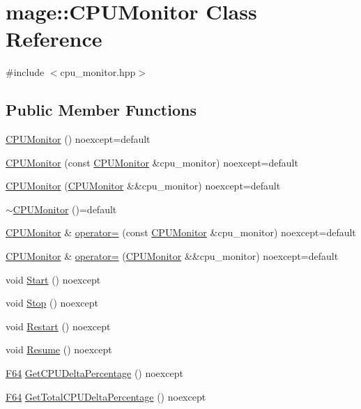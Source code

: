 \hypertarget{classmage_1_1_c_p_u_monitor}{}\section{mage\+:\+:C\+P\+U\+Monitor Class Reference}
\label{classmage_1_1_c_p_u_monitor}


{\ttfamily \#include $<$cpu\+\_\+monitor.\+hpp$>$}

\subsection*{Public Member Functions}
\begin{DoxyCompactItemize}
\item 
\mbox{\hyperlink{classmage_1_1_c_p_u_monitor_ad41542b831ae42cf8dbb206a70535598}{C\+P\+U\+Monitor}} () noexcept=default
\item 
\mbox{\hyperlink{classmage_1_1_c_p_u_monitor_a8d53a4b373c63d074fcb0cb969b3f7cb}{C\+P\+U\+Monitor}} (const \mbox{\hyperlink{classmage_1_1_c_p_u_monitor}{C\+P\+U\+Monitor}} \&cpu\+\_\+monitor) noexcept=default
\item 
\mbox{\hyperlink{classmage_1_1_c_p_u_monitor_a415f77c86323428f233f955249f5b252}{C\+P\+U\+Monitor}} (\mbox{\hyperlink{classmage_1_1_c_p_u_monitor}{C\+P\+U\+Monitor}} \&\&cpu\+\_\+monitor) noexcept=default
\item 
\mbox{\hyperlink{classmage_1_1_c_p_u_monitor_a597ea4b27675a22d3d66a1d817b26652}{$\sim$\+C\+P\+U\+Monitor}} ()=default
\item 
\mbox{\hyperlink{classmage_1_1_c_p_u_monitor}{C\+P\+U\+Monitor}} \& \mbox{\hyperlink{classmage_1_1_c_p_u_monitor_a878cc9fd170e6c34ee28f06591b06eeb}{operator=}} (const \mbox{\hyperlink{classmage_1_1_c_p_u_monitor}{C\+P\+U\+Monitor}} \&cpu\+\_\+monitor) noexcept=default
\item 
\mbox{\hyperlink{classmage_1_1_c_p_u_monitor}{C\+P\+U\+Monitor}} \& \mbox{\hyperlink{classmage_1_1_c_p_u_monitor_af1eacba414b2db72cf13d335f78785cd}{operator=}} (\mbox{\hyperlink{classmage_1_1_c_p_u_monitor}{C\+P\+U\+Monitor}} \&\&cpu\+\_\+monitor) noexcept=default
\item 
void \mbox{\hyperlink{classmage_1_1_c_p_u_monitor_a3f88acbb979f47309fd46f1b507fed09}{Start}} () noexcept
\item 
void \mbox{\hyperlink{classmage_1_1_c_p_u_monitor_a133aaed1df0e84486a6fc748d66615bb}{Stop}} () noexcept
\item 
void \mbox{\hyperlink{classmage_1_1_c_p_u_monitor_ab8b04a64545df631be0f40a54cc49e03}{Restart}} () noexcept
\item 
void \mbox{\hyperlink{classmage_1_1_c_p_u_monitor_a5fd594262dc1073da564955c58851760}{Resume}} () noexcept
\item 
\mbox{\hyperlink{namespacemage_ad26233bbec640deda836e572c1a23708}{F64}} \mbox{\hyperlink{classmage_1_1_c_p_u_monitor_a9f40f0907535869e767f8eca6a03caa5}{Get\+C\+P\+U\+Delta\+Percentage}} () noexcept
\item 
\mbox{\hyperlink{namespacemage_ad26233bbec640deda836e572c1a23708}{F64}} \mbox{\hyperlink{classmage_1_1_c_p_u_monitor_a7b711a492b936c01219876528d770cbc}{Get\+Total\+C\+P\+U\+Delta\+Percentage}} () noexcept
\end{DoxyCompactItemize}
